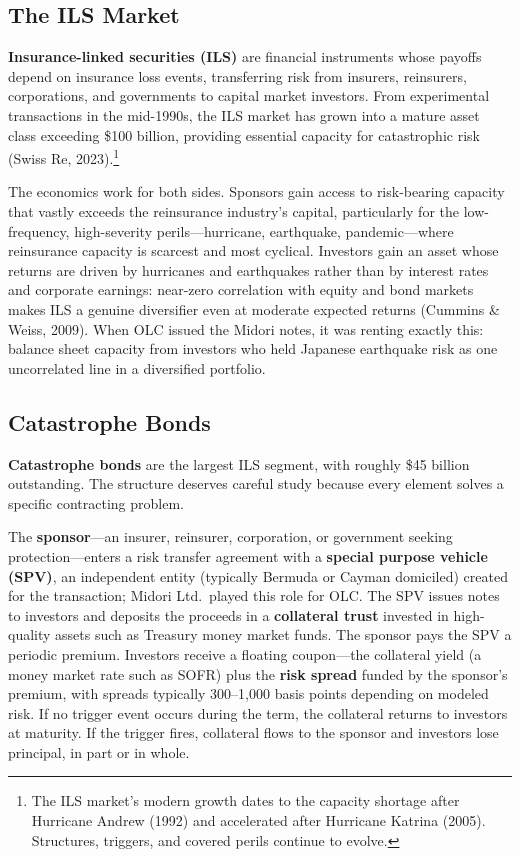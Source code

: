 \documentclass[11pt,openany]{book}
\begin{document}
\subsection{The ILS Market}

\textbf{Insurance-linked securities (ILS)} are financial instruments whose
payoffs depend on insurance loss events, transferring risk from insurers,
reinsurers, corporations, and governments to capital market investors. From
experimental transactions in the mid-1990s, the ILS market has grown into a
mature asset class exceeding \$100 billion, providing essential capacity for
catastrophic risk (Swiss Re, 2023).\footnote{The ILS market's modern growth
dates to the capacity shortage after Hurricane Andrew (1992) and accelerated
after Hurricane Katrina (2005). Structures, triggers, and covered perils
continue to evolve.}

The economics work for both sides. Sponsors gain access to risk-bearing
capacity that vastly exceeds the reinsurance industry's capital, particularly
for the low-frequency, high-severity perils---hurricane, earthquake,
pandemic---where reinsurance capacity is scarcest and most cyclical.
Investors gain an asset whose returns are driven by hurricanes and
earthquakes rather than by interest rates and corporate earnings: near-zero
correlation with equity and bond markets makes ILS a genuine diversifier even
at moderate expected returns (Cummins \& Weiss, 2009). When OLC issued the
Midori notes, it was renting exactly this: balance sheet capacity from
investors who held Japanese earthquake risk as one uncorrelated line in a
diversified portfolio.

\subsection{Catastrophe Bonds}
\label{subsec:catbonds}

\textbf{Catastrophe bonds} are the largest ILS segment, with roughly \$45
billion outstanding. The structure deserves careful study because every
element solves a specific contracting problem.

The \textbf{sponsor}---an insurer, reinsurer, corporation, or government
seeking protection---enters a risk transfer agreement with a \textbf{special
purpose vehicle (SPV)}, an independent entity (typically Bermuda or Cayman
domiciled) created for the transaction; Midori Ltd.\ played this role for
OLC. The SPV issues notes to investors and deposits the proceeds in a
\textbf{collateral trust} invested in high-quality assets such as Treasury
money market funds. The sponsor pays the SPV a periodic premium. Investors
receive a floating coupon---the collateral yield (a money market rate such as
SOFR) plus the \textbf{risk spread} funded by the sponsor's premium, with
spreads typically 300--1,000 basis points depending on modeled risk. If no
trigger event occurs during the term, the collateral returns to investors at
maturity. If the trigger fires, collateral flows to the sponsor and investors
lose principal, in part or in whole.
\end{document}
